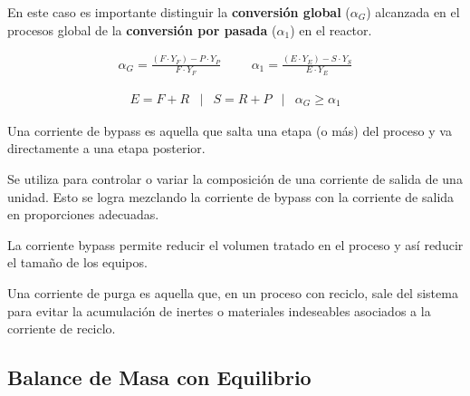             En este caso es importante distinguir la \textbf{conversión global} (\(\alpha_{G}\)) alcanzada en el procesos global de la \textbf{conversión por pasada} (\(\alpha_{1}\)) en el reactor.
            
            \[
            \begin{matrix}
                 \alpha_{G} = \frac{(F\cdot Y_{F}) - P \cdot Y_{P}}{F \cdot Y_{F}} & & & \alpha_{1} = \frac{(E\cdot Y_{E}) - S \cdot Y_{S}}{E \cdot Y_{E}}
            \end{matrix}
            \]
            
            \[
            \begin{matrix}
                 E = F + R & | & S = R + P & | &\alpha_{G} \geq \alpha_{1}
            \end{matrix}
            \]\newline
            
            
            
            Una corriente de bypass es aquella que salta una etapa (o más) del proceso y va directamente a una etapa posterior.
            
            Se utiliza para controlar o variar la composición de una corriente de salida de una unidad. Esto se logra mezclando la corriente de bypass con la corriente de salida en proporciones adecuadas.
            
            
            La corriente bypass permite reducir el volumen tratado en el proceso y así reducir el tamaño de los equipos.
            
            
            Una corriente de purga es aquella que, en un proceso con reciclo, sale del sistema para evitar la acumulación de inertes o materiales indeseables asociados a la corriente de reciclo.
    
    \subsection{Balance de Masa con Equilibrio}
    
